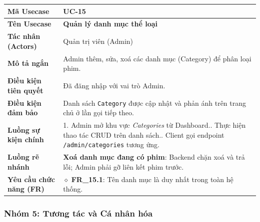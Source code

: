 \begin{table}[H]
\renewcommand{\arraystretch}{1.3}
\centering
\begin{tabularx}{\textwidth}{|p{4.5cm}|X|}
\hline
\cellcolor{gray!15}\bfseries Mã Usecase & \textbf{UC-15} \\ \hline
\cellcolor{gray!15}\bfseries Tên Usecase & \textbf{Quản lý danh mục thể loại} \\ \hline
\cellcolor{gray!15}\bfseries Tác nhân (Actors) & Quản trị viên (Admin) \\ \hline
\cellcolor{gray!15}\bfseries Mô tả ngắn & Admin thêm, sửa, xoá các danh mục (Category) để phân loại phim. \\ \hline
\cellcolor{gray!15}\bfseries Điều kiện tiên quyết & Đã đăng nhập với vai trò Admin. \\ \hline
\cellcolor{gray!15}\bfseries Điều kiện đảm bảo & Danh sách \texttt{Category} được cập nhật và phản ánh trên trang chủ ở lần gọi tiếp theo. \\ \hline
\cellcolor{gray!15}\bfseries Luồng sự kiện chính & 1. Admin mở khu vực \textit{Categories} từ Dashboard.\newline 2. Thực hiện thao tác CRUD trên danh sách.\newline 3. Client gọi endpoint \texttt{/admin/categories} tương ứng. \\ \hline
\cellcolor{gray!15}\bfseries Luồng rẽ nhánh & \textbf{Xoá danh mục đang có phim}: Backend chặn xoá và trả lỗi; Admin phải gỡ liên kết phim trước. \\ \hline
\cellcolor{gray!15}\bfseries Yêu cầu chức năng (FR) & $\diamond$ \textbf{FR\_15.1}: Tên danh mục là duy nhất trong toàn hệ thống. \\ \hline
\end{tabularx}
\end{table}


\subsubsection*{Nhóm 5: Tương tác và Cá nhân hóa}

